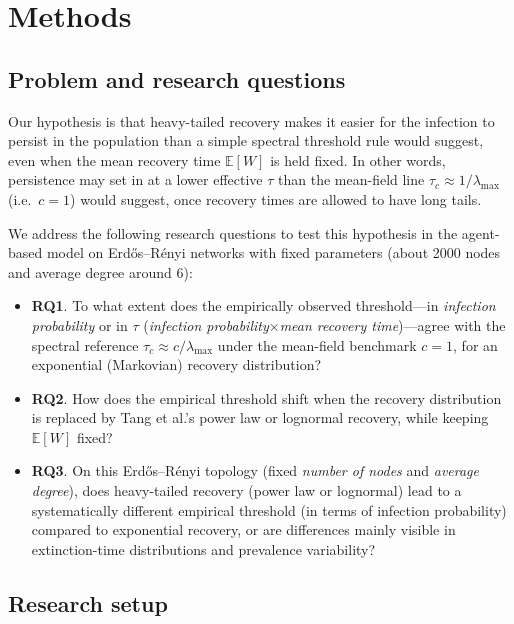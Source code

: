 \documentclass[11pt,a4paper]{article}
\begin{document}
\section{Methods}
\label{sec:methods}

\subsection*{Problem and research questions}

Our hypothesis is that heavy-tailed recovery makes it easier for the infection to persist in the population than a simple spectral threshold rule would suggest, even when the mean recovery time $\mathbb{E}[W]$ is held fixed. In other words, persistence may set in at a lower effective $\tau$ than the mean-field line $\tau_c \approx 1/\lambda_{\max}$ (i.e.\ $c=1$) would suggest, once recovery times are allowed to have long tails.

We address the following research questions to test this hypothesis in the agent-based model on Erd\H{o}s--R\'enyi networks with fixed parameters (about 2000 nodes and average degree around 6):

\begin{itemize}[leftmargin=*]
  \item \textbf{RQ1}. To what extent does the empirically observed threshold---in \emph{infection probability} or in $\tau$ (\emph{infection probability}$\times$\emph{mean recovery time})---agree with the spectral reference $\tau_c \approx c/\lambda_{\max}$ under the mean-field benchmark $c=1$, for an exponential (Markovian) recovery distribution?
  \item \textbf{RQ2}. How does the empirical threshold shift when the recovery distribution is replaced by Tang et al.'s power law or lognormal recovery, while keeping $\mathbb{E}[W]$ fixed?
  \item \textbf{RQ3}. On this Erd\H{o}s--R\'enyi topology (fixed \emph{number of nodes} and \emph{average degree}), does heavy-tailed recovery (power law or lognormal) lead to a systematically different empirical threshold (in terms of infection probability) compared to exponential recovery, or are differences mainly visible in extinction-time distributions and prevalence variability?
\end{itemize}

\subsection*{Research setup}
\end{document}
